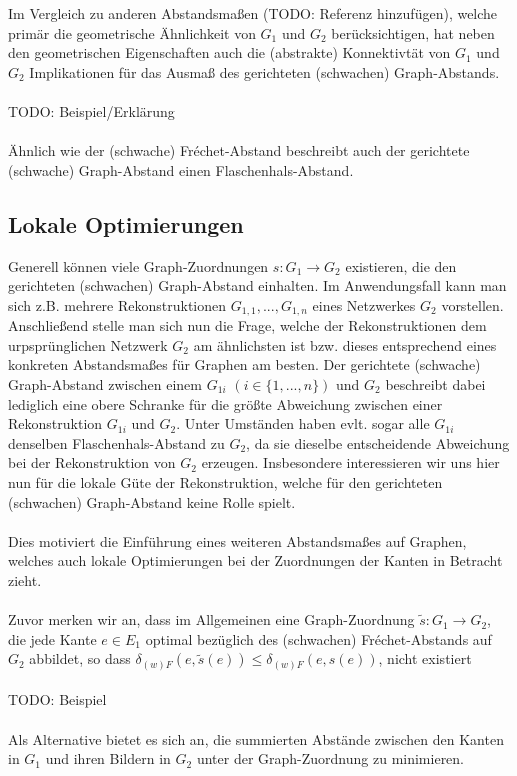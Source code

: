\documentclass[a4paper, 12pt, twoside]{article}
\theoremstyle{Format1} %
\begin{document}
Im Vergleich zu anderen Abstandsmaßen (TODO: Referenz hinzufügen), welche primär die geometrische Ähnlichkeit von $G_1$ und $G_2$ berücksichtigen, hat neben den geometrischen Eigenschaften auch die (abstrakte) Konnektivtät von $G_1$ und $G_2$
Implikationen für das Ausmaß des gerichteten (schwachen) Graph-Abstands.
\\
\\
TODO: Beispiel/Erklärung
\\
\\
Ähnlich wie der (schwache) Fréchet-Abstand beschreibt auch der gerichtete (schwache) Graph-Abstand einen Flaschenhals-Abstand.

\subsection{Lokale Optimierungen}

Generell können viele Graph-Zuordnungen $s: G_1 \to G_2$ existieren, die den gerichteten (schwachen) Graph-Abstand einhalten.
Im Anwendungsfall kann man sich z.B. mehrere Rekonstruktionen $G_{1,1}, ..., G_{1,n}$ eines Netzwerkes $G_2$ vorstellen.
Anschließend stelle man sich nun die Frage, welche der Rekonstruktionen dem urpsprünglichen Netzwerk $G_2$ am ähnlichsten ist bzw. dieses entsprechend eines konkreten Abstandsmaßes
für Graphen am besten.
Der gerichtete (schwache) Graph-Abstand zwischen einem $G_{1i}$ $(i \in \{1,...,n\})$ und $G_2$ beschreibt dabei lediglich eine obere Schranke für die größte Abweichung zwischen
einer Rekonstruktion $G_{1i}$ und $G_2$.
Unter Umständen haben evlt. sogar alle $G_{1i}$ denselben Flaschenhals-Abstand zu $G_2$, da sie dieselbe entscheidende Abweichung bei der Rekonstruktion von $G_2$ erzeugen.
Insbesondere interessieren wir uns hier nun für die lokale Güte der Rekonstruktion, welche für den gerichteten (schwachen) Graph-Abstand keine Rolle spielt.
\\
\\
Dies motiviert die Einführung eines weiteren Abstandsmaßes auf Graphen, welches auch lokale Optimierungen bei der Zuordnungen der Kanten in Betracht zieht.
\\
\\
Zuvor merken wir an, dass im Allgemeinen eine Graph-Zuordnung $\tilde{s}: G_1 \to G_2$, die jede Kante $e \in E_1$ optimal bezüglich des (schwachen)
Fréchet-Abstands auf $G_2$ abbildet, so dass $\delta_{(w)F}(e, \tilde{s}(e)) \leq \delta_{(w)F}(e, s(e))$, nicht existiert
\\
\\
TODO: Beispiel
\\
\\
Als Alternative bietet es sich an, die summierten Abstände zwischen den Kanten in $G_1$ und ihren Bildern in $G_2$ unter der Graph-Zuordnung zu minimieren.
\end{document}
